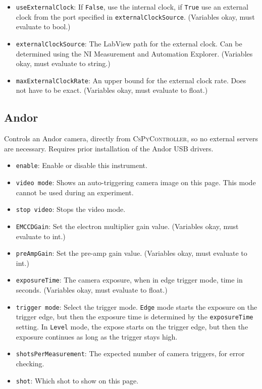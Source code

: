 \documentclass[pdftex,11pt,letterpaper]{article}
\begin{document}
\begin{itemize}
\item \texttt{useExternalClock}:  If \texttt{False}, use the internal clock, if \texttt{True} use an external clock from the port specified in \texttt{externalClockSource}.  (Variables okay, must evaluate to bool.)
\item \texttt{externalClockSource}:  The LabView path for the external clock.  Can be determined using the NI Measurement and Automation Explorer.  (Variables okay, must evaluate to string.)
\item \texttt{maxExternalClockRate}:  An upper bound for the external clock rate.  Does not have to be exact.  (Variables okay, must evaluate to float.)
\end{itemize}

\subsection{Andor}

Controls an Andor camera, directly from \textsc{CsPyController}, so no external servers are necessary.  Requires prior installation of the Andor USB drivers.

\begin{itemize}
\item \texttt{enable}:  Enable or disable this instrument.
\item \texttt{video mode}:  Shows an auto-triggering camera image on this page.  This mode cannot be used during an experiment.
\item \texttt{stop video}:  Stops the video mode.
\item \texttt{EMCCDGain}:  Set the electron multiplier gain value.  (Variables okay, must evaluate to int.)
\item \texttt{preAmpGain}:   Set the pre-amp gain value.  (Variables okay, must evaluate to int.)
\item \texttt{exposureTime}:  The camera exposure, when in edge trigger mode, time in seconds.  (Variables okay, must evaluate to float.)
\item \texttt{trigger mode}:  Select the trigger mode.  \texttt{Edge} mode starts the exposure on the trigger edge, but then the exposure time is determined by the \texttt{exposureTime} setting.  In \texttt{Level} mode, the expose starts on the trigger edge, but then the exposure continues as long as the trigger stays high.
\item \texttt{shotsPerMeasurement}:  The expected number of camera triggers, for error checking.
\item \texttt{shot}:  Which shot to show on this page.
\end{itemize}
\end{document}
